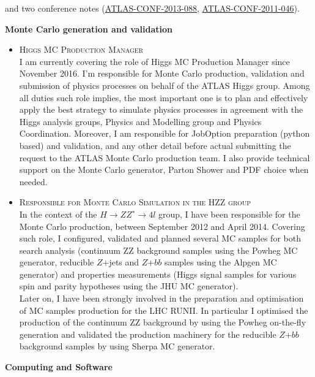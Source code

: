 \begin{cvinterests}
{\begin{itemize}[labelwidth=0.05in,align=right,leftmargin=!,labelsep=0pt,
itemsep=0.0em]
and two conference notes (\href{https://cds.cern.ch/record/1580207}{ATLAS-CONF-2013-088},
\href{https://atlas.web.cern.ch/Atlas/GROUPS/PHYSICS/CONFNOTES/ATLAS-CONF-2011-046/}{ATLAS-CONF-2011-046}).
\end{itemize}
%
\textbf{Monte Carlo generation and validation}\\
\vspace{-1.8em}
\begin{itemize}[labelwidth=0.05in,align=right,leftmargin=!,labelsep=0pt,
itemsep=0.0em]
\item[] \textsc{Higgs MC Production Manager}\\
I am currently covering the role of Higgs MC Production Manager since November
2016. I'm responsible for Monte Carlo production, validation and submission
of physics processes on behalf of the ATLAS Higgs group. Among all duties such
role implies, the most important one is to plan and effectively apply the best
strategy to simulate physics processes in agreement with the Higgs analysis
groups, Physics and Modelling group and Physics Coordination. Moreover, I am
responsible for JobOption preparation (python based) and validation, and any
other detail before actual submitting the request to the ATLAS Monte Carlo
production team. I also provide technical support on the Monte Carlo generator,
Parton Shower and PDF choice when needed.
%
\item[] \textsc{Responsible for Monte Carlo Simulation in the HZZ group}\\
In the context of the $H\to ZZ^{∗}\to 4l$ group, I have been responsible for 
the Monte Carlo production, between September 2012 and April 2014. Covering such
role, I configured, validated and planned several MC samples for both search
analysis (continuum ZZ background samples using the Powheg MC generator,
reducible $Z$+jets and $Z$+$bb$ samples using the Alpgen MC generator) and
properties measurements (Higgs signal samples for various spin and parity
hypotheses using the JHU MC generator).\\
Later on, I have been strongly involved in the preparation and optimisation of
MC samples production for the LHC RUNII. In particular I optimised the
production of the continuum ZZ background by using the Powheg on-the-fly
generation and validated the production machinery for the reducible $Z$+$bb$
background samples by using Sherpa MC generator.
\end{itemize}
%
\textbf{Computing and Software}\\
\vspace{-1.8em}
}
\end{cvinterests}
